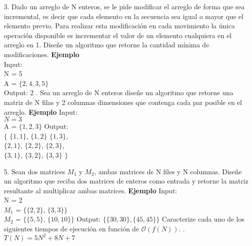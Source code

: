 \documentclass[12pt]{article}
\begin{document}
3. 
\newline 
Dado un arreglo de N enteros, se le pide modificar el arreglo de forma que sea incremental, es decir que cada elemento en la secuencia sea igual o mayor que el elemento previo.
Para realizar esta modificación en cada movimiento la única operación disponible es incrementar el valor de un elemento cualquiera en el arreglo en 1. Diseñe un algoritmo que retorne la cantidad mínima de modificaciones.
\newline
\newline
\textbf{Ejemplo}\\
Input: \\ N = 5 \\ A = $\{ 2, 4, 3, 5\}$ \\ 
Output: 2
. 
\newline 
Sea un arreglo de N enteros diseñe un algoritmo que retorne una matriz de N filas y 2 columnas dimensiones que contenga cada par posible en el arreglo. 
\newline
\textbf{Ejemplo}
\newline
Input: \\$N = 3$ \\ A = $\{ 1, 2, 3\}$
\newline
Output: \\ 
$\{$ $\{ 1, 1\}$, $\{1, 2 \}$ $\{ 1, 3\}$, \\  $\{ 2, 1\}$, $\{ 2, 2\}$, $\{ 2, 3\}$, \\ $\{ 3, 1\}$, $\{ 3, 2\}$, $\{ 3, 3\}$ $\}$ 

5. 
\newline
Sean dos matrices $M_{1}$ y $M_{2}$, ambas matrices de N files y N columnas. Diseñe un algoritmo que reciba dos matrices de enteros como entrada y retorne la matriz resultante al multiplicar ambas matrices.
\newline 
\textbf{Ejemplo}
Input: \\ N = 2 \\ $M_1$ = $ \{ \{ 2, 2\} $, $\{ 3, 3\} \}$ \\ $M_2$ = $ \{ \{ 5, 5\} $, $\{ 10, 10\} \}$ 
\newline 
Output: $\{ \{ 30, 30\}, \{ 45, 45\} \}$
\newpage
{}
Caracterize cada uno de los siguientes tiempos de ejecución en función de $\mathcal{O}(f(N))$.
. $T(N) = 5N^2 + 8N + 7$
\newline\hspace{0.5cm}
\end{document}

